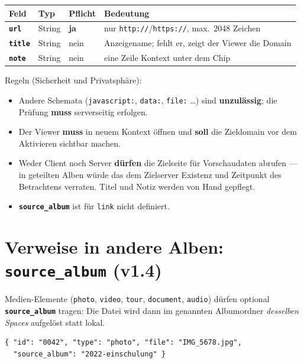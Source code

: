 \documentclass[11pt,a4paper]{article}
\let\mpdtt\texttt
\renewcommand{\texttt}[1]{\mpdtt{\textcolor{mpdred}{#1}}}
\newcommand{\feld}[1]{\mpdtt{\textbf{\textcolor{mpdred}{#1}}}}
\newcommand{\kopf}[1]{\textbf{#1}}
\begin{document}
\begin{tabularx}{\linewidth}{|l|l|l|L|}
\hline
{}\kopf{Feld} & \kopf{Typ} & \kopf{Pflicht} & \kopf{Bedeutung} \\
\hline
\feld{url} & String & \textbf{ja} & nur \texttt{http://}/\texttt{https://}, max.\ 2048 Zeichen \\
\feld{title} & String & nein & Anzeigename; fehlt er, zeigt der Viewer die Domain \\
\feld{note} & String & nein & eine Zeile Kontext unter dem Chip \\
\hline
\end{tabularx}

Regeln (Sicherheit und Privatsphäre):
\begin{itemize}
  \item Andere Schemata (\texttt{javascript:}, \texttt{data:},
        \texttt{file:} …) sind \textbf{unzulässig}; die Prüfung
        \textbf{muss} serverseitig erfolgen.
  \item Der Viewer \textbf{muss} in neuem Kontext öffnen und \textbf{soll}
        die Zieldomain vor dem Aktivieren sichtbar machen.
  \item Weder Client noch Server \textbf{dürfen} die Zielseite für
        Vorschaudaten abrufen — in geteilten Alben würde das dem
        Zielserver Existenz und Zeitpunkt des Betrachtens verraten.
        Titel und Notiz werden von Hand gepflegt.
  \item \feld{source\_album} ist für \texttt{link} nicht definiert.
\end{itemize}

\section{Verweise in andere Alben: \texttt{source\_album} \;(v1.4)}\label{sec:source}

Medien-Elemente (\texttt{photo}, \texttt{video}, \texttt{tour},
\texttt{document}, \texttt{audio}) dürfen optional
\feld{source\_album} tragen: Die Datei wird dann im genannten
Albumordner \emph{desselben Spaces} aufgelöst statt lokal.

\begin{lstlisting}
{ "id": "0042", "type": "photo", "file": "IMG_5678.jpg",
  "source_album": "2022-einschulung" }
\end{lstlisting}
\end{document}
